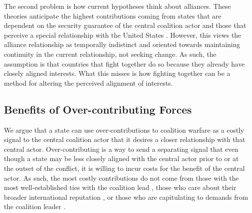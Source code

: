 \documentclass[12pt,letterpaper]{article}
\begin{document}
		The second problem is how current hypotheses think about alliances. These theories anticipate the highest contributions coming from states that are dependent on the security guarantee of the central coalition actor and those that perceive a special relationship with the United States \citep{haesebrouck_democraticparticipationair_2016, howorth_securitydefencepolicy_2014, graeger_revivalatlanticismnato_2009, biehl_strategiccultureseurope_2013}. However, this views the alliance relationship as temporally indistinct and oriented towards maintaining continuity in the current relationship, not seeking change. As such, the assumption is that countries that fight together do so because they already have closely aligned interests. What this misses is how fighting together can be a method for altering the perceived alignment of interests.

	\subsection{Benefits of Over-contributing Forces}
		We argue that a state can use over-contributions to coalition warfare as a costly signal to the central coalition actor that it desires a closer relationship with that central actor. Over-contributing is a way to send a separating signal that even though a state may be less closely aligned with the central actor prior to or at the outset of the conflict, it is willing to incur costs for the benefit of the central actor. As such, the most costly contributions do not come from those with the most well-established ties with the coalition lead \citep{ringsmose_natoburdensharingredux_2010}, those who care about their broader international reputation \citep{pedersen_bandwagonstatuschanging_2018}, or those who are capitulating to demands from the coalition leader \citep{schweller_newrealistresearch_1997}.
\end{document}

